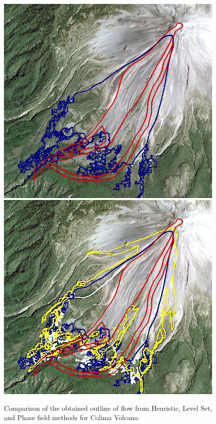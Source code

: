 \documentclass[review]{elsarticle}
\begin{document}
\begin{figure}[H]
\begin{minipage}[b]{.5\textwidth}
\end{minipage}
\begin{minipage}[b]{.5 \textwidth}
                \centering
                \includegraphics[width=1\textwidth]{IMAGES/phasefield1.png}
                \includegraphics[width=1\textwidth]{IMAGES/comparison1.png}
        \end{minipage}
        \caption{Comparison of the obtained outline of flow from Heuristic, Level Set, and Phase field methods for Colima Volcano.}
        \label{Colimapic}
\end{figure}
\end{document}
